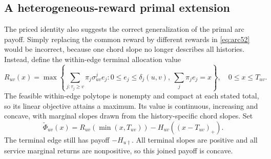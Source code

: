 \subsection{A heterogeneous-reward primal extension}\label{sec:packing54}
The priced identity also suggests the correct generalization of the primal arc payoff. Simply replacing the common reward by different rewards in \eqref{eq:arc52} would be incorrect, because one chord slope no longer describes all histories. Instead, define the within-edge terminal allocation value
\begin{equation}\label{eq:terminalprofile54}
 R_{uv}(x)=\max\left\{\sum_{j:\tau_j\geq v}\pi_j\sigma^j_{uv}e_j:
 0\leq e_j\leq\delta_j(u,v),\ \sum_j\pi_je_j=x\right\},\quad 0\leq x\leq T_{uv}.
\end{equation}
The feasible within-edge polytope is nonempty and compact at each stated total, so its linear objective attains a maximum. Its value is continuous, increasing and concave, with marginal slopes drawn from the history-specific chord slopes. Set
\begin{equation}\label{eq:heteroarc54}
 \widetilde\Phi_{uv}(x)=R_{uv}(\min(x,T_{uv}))-H_{uv}((x-T_{uv})_+).
\end{equation}
The terminal edge still has payoff $-H_{u\dagger}$. All terminal slopes are positive and all service marginal returns are nonpositive, so this joined payoff is concave.

